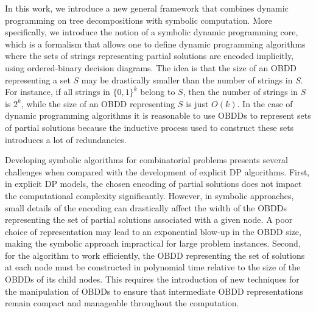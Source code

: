 In this work, we introduce a new general framework that combines dynamic programming on tree decompositions with symbolic computation. More specifically, we introduce the notion of a symbolic dynamic programming core, which is a formalism that allows one to define dynamic programming algorithms where the sets of strings representing partial solutions are encoded implicitly, using ordered-binary decision diagrams. The idea is that the size of an OBDD representing a set $S$ may be drastically smaller than the number of strings in $S$. For instance, if all strings in $\{0,1\}^k$ belong to $S$, then the number of strings in $S$ is $2^{k}$, while the size of an OBDD representing $S$ is just $O(k)$. In the case of dynamic programming algorithms it is reasonable to use OBDDs to represent sets of partial solutions because the inductive process used to construct these sets introduces a lot of redundancies. 

Developing symbolic algorithms for combinatorial problems presents several challenges when compared with the development of explicit DP algorithms. First, in explicit DP models, the chosen encoding of partial solutions does not impact the computational complexity significantly. However, in symbolic approaches, small details of the encoding can drastically affect the width of the OBDDs representing the set of partial solutions associated with a given node. A poor choice of representation may lead to an exponential blow-up in the OBDD size, making the symbolic approach impractical for large problem instances. Second, for the algorithm to work efficiently, the OBDD representing the set of solutions at each node must be constructed in polynomial time relative to the size of the OBDDs of its child nodes. This requires the introduction of new techniques for the manipulation of OBDDs to ensure that intermediate OBDD representations remain compact and manageable throughout the computation.

